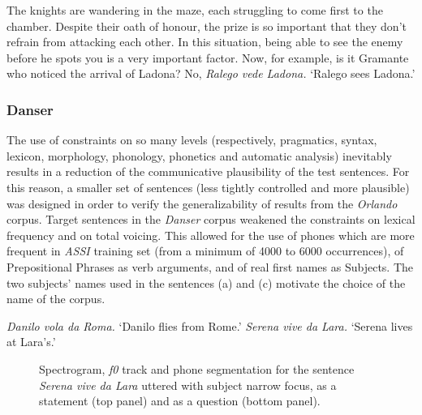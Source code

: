 \eal
\ex The knights are wandering in the maze, each struggling to come first to the chamber. Despite their oath of honour, the prize is so important that they don't refrain from attacking each other. In this situation, being able to see the enemy before he spots you is a very important factor. Now, for example, is it Gramante who noticed the arrival of Ladona?  
\ex No, \textit{Ralego vede Ladona.}
\ex `Ralego sees Ladona.'
\zl

\subsubsection{Danser}\label{sec4212}
The use of constraints on so many levels (respectively, pragmatics, syntax, lexicon, morphology, phonology, phonetics and automatic analysis) inevitably results in a reduction of the communicative plausibility of the test sentences. For this reason, a smaller set of sentences (less tightly controlled and more plausible) was designed in order to verify the generalizability of results from the \textit{Orlando} corpus. Target sentences in the \textit{Danser} corpus weakened the constraints on lexical frequency and on total voicing. This allowed for the use of phones which are more frequent in \textit{ASSI} training set (from a minimum of 4000 to 6000 occurrences), of Prepositional Phrases as verb arguments, and of real first names as Subjects. The two subjects' names used in the sentences (a) and (c) motivate the choice of the name of the corpus.

\eal
\ex \textit{Danilo vola da Roma.}
\ex `Danilo flies from Rome.'
\ex \textit{Serena vive da Lara.}
\ex `Serena lives at Lara's.'
\zl

\begin{figure}
\centering
{}
\caption{Spectrogram, \textit{f0} track and phone segmentation for the sentence \textit{Serena vive da Lara} uttered with subject narrow focus, as a statement (top panel) and as a question (bottom panel).}
\label{fig401}\end{figure}

